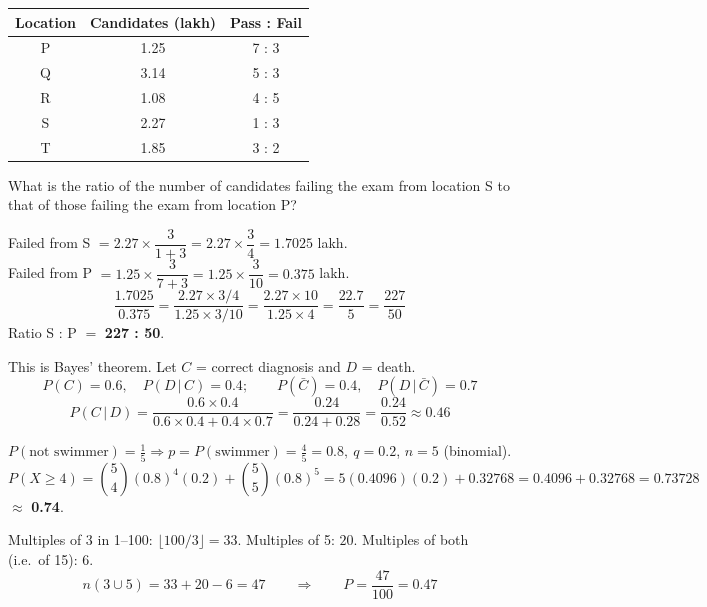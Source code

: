 \begin{tabular}{ccc}\toprule
\textbf{Location} & \textbf{Candidates (lakh)} & \textbf{Pass : Fail}\\\midrule
P & 1.25 & 7 : 3\\ Q & 3.14 & 5 : 3\\ R & 1.08 & 4 : 5\\ S & 2.27 & 1 : 3\\ T & 1.85 & 3 : 2\\\bottomrule
\end{tabular}

What is the ratio of the number of candidates failing the exam from location S to that of those failing the exam from location P?

Failed from S $= 2.27 \times \dfrac{3}{1+3} = 2.27\times\dfrac34 = 1.7025$ lakh.\\
Failed from P $= 1.25 \times \dfrac{3}{7+3} = 1.25\times\dfrac{3}{10} = 0.375$ lakh.
\[\frac{1.7025}{0.375} = \frac{2.27\times 3/4}{1.25\times 3/10} = \frac{2.27\times 10}{1.25\times 4} = \frac{22.7}{5} = \frac{227}{50}\]
Ratio S : P $=$ \textbf{227 : 50}.

This is Bayes' theorem. Let $C$ = correct diagnosis and $D$ = death.
\[P(C)=0.6,\quad P(D\,|\,C)=0.4;\qquad P(\bar C)=0.4,\quad P(D\,|\,\bar C)=0.7\]
\[P(C\,|\,D)=\frac{0.6\times0.4}{0.6\times0.4+0.4\times0.7}=\frac{0.24}{0.24+0.28}=\frac{0.24}{0.52}\approx \mathbf{0.46}\]
\begin{center}
\end{center}

$P(\text{not swimmer})=\tfrac15 \Rightarrow p=P(\text{swimmer})=\tfrac45=0.8,\ q=0.2$, $n=5$ (binomial).
\[P(X\ge4)=\binom54(0.8)^4(0.2)+\binom55(0.8)^5=5(0.4096)(0.2)+0.32768=0.4096+0.32768=0.73728\]
$\approx$ \textbf{0.74}.

Multiples of 3 in 1--100: $\lfloor100/3\rfloor=33$. Multiples of 5: $20$. Multiples of both (i.e.\ of 15): $6$.
\[n(3\cup5)=33+20-6=47\qquad\Rightarrow\qquad P=\frac{47}{100}=\mathbf{0.47}\]

